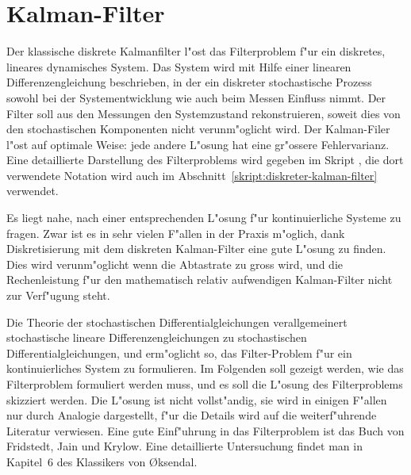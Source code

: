 %
%
\section{Kalman-Filter\label{section:kalman}}
Der klassische diskrete Kalmanfilter l"ost das Filterproblem f"ur ein
diskretes, lineares dynamisches System.
Das System wird mit Hilfe einer linearen Differenzengleichung beschrieben,
in der ein diskreter stochastische Prozess sowohl bei der Systementwicklung
wie auch beim Messen Einfluss nimmt.
Der Filter soll aus den Messungen den Systemzustand rekonstruieren, soweit
dies von den stochastischen Komponenten nicht verunm"oglicht wird.
Der Kalman-Filer l"ost auf optimale Weise: jede andere L"osung hat
eine gr"ossere Fehlervarianz.
Eine detaillierte Darstellung des Filterproblems wird gegeben im
Skript \cite{skript:wrstat}, die dort verwendete Notation wird auch
im Abschnitt~\ref{skript:diskreter-kalman-filter} verwendet.

Es liegt nahe, nach einer entsprechenden L"osung f"ur kontinuierliche
Systeme zu fragen.
Zwar ist es in sehr vielen F"allen in der Praxis m"oglich, dank
Diskretisierung mit dem diskreten Kalman-Filter eine gute L"osung
zu finden.
Dies wird verunm"oglicht wenn die Abtastrate zu gross wird, und die
Rechenleistung f"ur den mathematisch relativ aufwendigen
Kalman-Filter nicht zur Verf"ugung steht.

Die Theorie der stochastischen Differentialgleichungen verallgemeinert
stochastische lineare Differenzengleichungen zu stochastischen
Differentialgleichungen, und erm"oglicht so, das Filter-Problem f"ur
ein kontinuierliches System zu formulieren.
Im Folgenden soll gezeigt werden, wie das Filterproblem formuliert
werden muss, und es soll die L"osung des Filterproblems skizziert werden.
Die L"osung ist nicht vollst"andig, sie wird in einigen F"allen nur durch
Analogie dargestellt, f"ur die Details wird auf die weiterf"uhrende
Literatur verwiesen.
Eine gute Einf"uhrung in das Filterproblem ist das Buch \cite{skript:filter}
von Fridstedt, Jain und Krylow.
Eine detaillierte Untersuchung findet man in Kapitel~6 des Klassikers
\cite{skript:oksendal} von \O{}ksendal.

%
%

